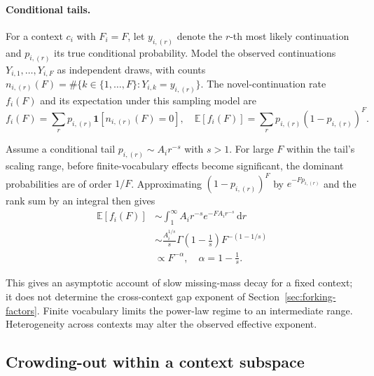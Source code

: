 \paragraph{Conditional tails.}
For a context $c_i$ with $F_i=F$, let $y_{i,(r)}$ denote the $r$-th most likely continuation and $p_{i,(r)}$ its true conditional probability. Model the observed continuations $Y_{i,1},\ldots,Y_{i,F}$ as independent draws, with counts $n_{i,(r)}(F)=\#\{k\in\{1,\ldots,F\}:Y_{i,k}=y_{i,(r)}\}$. The novel-continuation rate $f_i(F)$ and its expectation under this sampling model are
\begin{equation}
f_i(F)=\sum_r p_{i,(r)}
\mathbf{1}\left[n_{i,(r)}(F)=0\right],
\quad
\mathbb{E}[f_i(F)]=\sum_r p_{i,(r)}(1-p_{i,(r)})^F.
\end{equation}

Assume a conditional tail $p_{i,(r)}\sim A_i r^{-s}$ with $s>1$. For large $F$ within the tail's scaling range, before finite-vocabulary effects become significant, the dominant probabilities are of order $1/F$. Approximating $(1-p_{i,(r)})^F$ by $e^{-Fp_{i,(r)}}$ and the rank sum by an integral then gives
\citep{gnedin2007occupancy}
\begin{equation}
\begin{aligned}
\mathbb{E}[f_i(F)]
&\sim
\int_1^\infty A_i r^{-s}e^{-F A_i r^{-s}}\,\mathrm{d}r\\
&\sim
\frac{A_i^{1/s}}{s}
\Gamma\left(1-\frac{1}{s}\right)
F^{-(1-1/s)}\\
&\propto F^{-\alpha},
\quad
\alpha=1-\frac{1}{s}.
\end{aligned}
\label{eq:occupancy}
\end{equation}

This gives an asymptotic account of slow missing-mass decay for a fixed context; it does not determine the cross-context gap exponent of Section~\ref{sec:forking-factors}. Finite vocabulary limits the power-law regime to an intermediate range. Heterogeneity across contexts may alter the observed effective exponent.

\subsection{Crowding-out within a context subspace}
\label{app:crowding-derivation}

